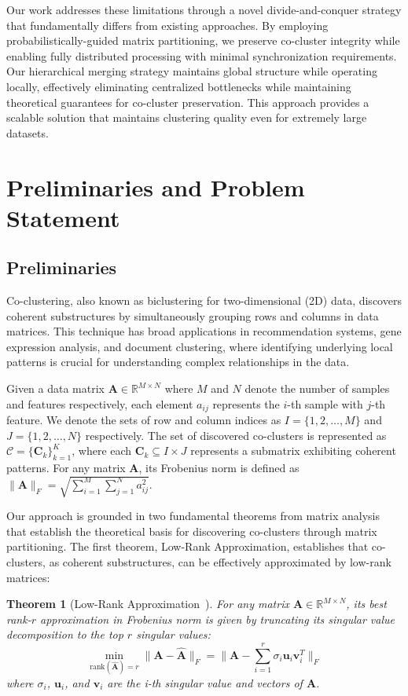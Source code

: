 \documentclass[journal]{IEEEtran}
\newtheorem{theorem}{Theorem}
\renewcommand{\cite}[1]{~\autocite{#1}}
\begin{document}
Our work addresses these limitations through a novel divide-and-conquer strategy that fundamentally differs from existing approaches. By employing probabilistically-guided matrix partitioning, we preserve co-cluster integrity while enabling fully distributed processing with minimal synchronization requirements. Our hierarchical merging strategy maintains global structure while operating locally, effectively eliminating centralized bottlenecks while maintaining theoretical guarantees for co-cluster preservation. This approach provides a scalable solution that maintains clustering quality even for extremely large datasets.

\section{Preliminaries and Problem Statement}
\label{sec:problem_formulation}
\subsection{Preliminaries}
Co-clustering, also known as biclustering for two-dimensional (2D) data, discovers coherent substructures by simultaneously grouping rows and columns in data matrices. This technique has broad applications in recommendation systems, gene expression analysis, and document clustering, where identifying underlying local patterns is crucial for understanding complex relationships in the data.

Given a data matrix $\mathbf{A} \in \mathbb{R}^{M \times N}$ where $M$ and $N$ denote the number of samples and features respectively, each element $a_{ij}$ represents the $i$-th sample with $j$-th feature. We denote the sets of row and column indices as $I = \{1,2,\ldots,M\}$ and $J = \{1,2,\ldots,N\}$ respectively. The set of discovered co-clusters is represented as $\mathcal{C} = \{\mathbf{C}_k\}_{k=1}^K$, where each $\mathbf{C}_k \subseteq I \times J$ represents a submatrix exhibiting coherent patterns. For any matrix $\mathbf{A}$, its Frobenius norm is defined as $\|\mathbf{A}\|_F = \sqrt{\sum_{i=1}^M \sum_{j=1}^N a_{ij}^2}$.

Our approach is grounded in two fundamental theorems from matrix analysis that establish the theoretical basis for discovering co-clusters through matrix partitioning. The first theorem, Low-Rank Approximation, establishes that co-clusters, as coherent substructures, can be effectively approximated by low-rank matrices:

\begin{theorem}[Low-Rank Approximation\cite{eckart1936ApproximationOneMatrix}]
    For any matrix $\mathbf{A} \in \mathbb{R}^{M \times N}$, its best rank-$r$ approximation in Frobenius norm is given by truncating its singular value decomposition to the top $r$ singular values:
    \begin{equation}
        \min_{\text{rank}(\hat{\mathbf{A}})=r} \|\mathbf{A} - \hat{\mathbf{A}}\|_F = \|\mathbf{A} - \sum_{i=1}^r \sigma_i \mathbf{u}_i\mathbf{v}_i^T\|_F
    \end{equation}
    where $\sigma_i$, $\mathbf{u}_i$, and $\mathbf{v}_i$ are the i-th singular value and vectors of $\mathbf{A}$.
\end{theorem}
\end{document}
